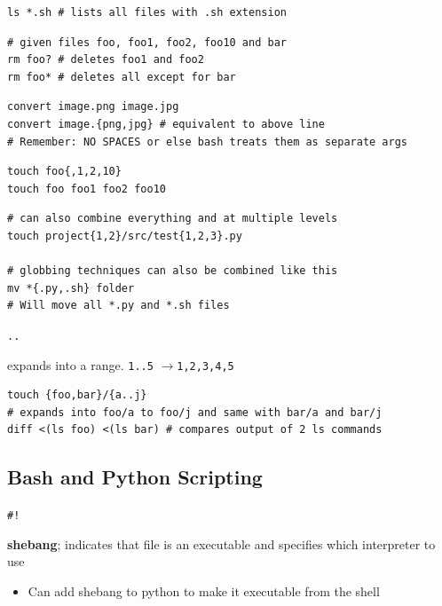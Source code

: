 \documentclass[letterpaper,12pt]{article}
\newcommand*{\lstitem}[1]{
  \setbox0\hbox{\lstinline{#1}}
  \item[\usebox0]
}
\newcommand{\lra}{\ensuremath{\longrightarrow{}}}
\begin{document}
\begin{lstlisting}
ls *.sh # lists all files with .sh extension
\end{lstlisting}

\begin{lstlisting}
# given files foo, foo1, foo2, foo10 and bar
rm foo? # deletes foo1 and foo2
rm foo* # deletes all except for bar
\end{lstlisting}

\begin{lstlisting}
convert image.png image.jpg
convert image.{png,jpg} # equivalent to above line
# Remember: NO SPACES or else bash treats them as separate args
\end{lstlisting}

\begin{lstlisting}
touch foo{,1,2,10}
touch foo foo1 foo2 foo10
\end{lstlisting}

\begin{lstlisting}
# can also combine everything and at multiple levels
touch project{1,2}/src/test{1,2,3}.py

# globbing techniques can also be combined like this
mv *{.py,.sh} folder
# Will move all *.py and *.sh files
\end{lstlisting}

\begin{description}
 \lstitem{..} expands into a range. \lstinline{1..5} \lra \lstinline{1,2,3,4,5}
\end{description}

\begin{lstlisting}
touch {foo,bar}/{a..j}
# expands into foo/a to foo/j and same with bar/a and bar/j
diff <(ls foo) <(ls bar) # compares output of 2 ls commands
\end{lstlisting}

\subsection{Bash and Python Scripting}

\begin{description}
 \lstitem{#!} \textbf{shebang}; indicates that file is an executable and specifies which interpreter to use
\end{description}

\begin{itemize}
 \item Can add shebang to python to make it executable from the shell
\end{itemize}
\end{document}
